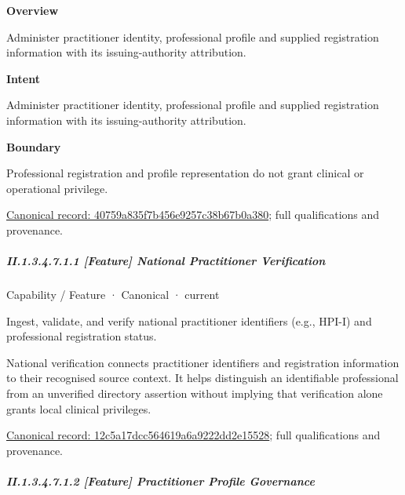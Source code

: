 \textbf{Overview}



Administer practitioner identity, professional profile and supplied registration information with its issuing-authority attribution.



\textbf{Intent}



Administer practitioner identity, professional profile and supplied registration information with its issuing-authority attribution.



\textbf{Boundary}



Professional registration and profile representation do not grant clinical or operational privilege.


{\footnotesize \href{../../../../../../../continuum/strategy/capability/40759a835f7b456e9257c38b67b0a380.md}{Canonical record: 40759a835f7b456e9257c38b67b0a380}; full qualifications and provenance.}\par
\subparagraph*{II.1.3.4.7.1.1 [Feature] National Practitioner Verification}
\label{navigation:II.1.3.4.7.1.1}

\label{element:12c5a17dcc564619a6a9222dd2e15528}
{\small Capability / Feature · Canonical · current}\par

Ingest, validate, and verify national practitioner identifiers (e.g., HPI-I) and professional registration status.



National verification connects practitioner identifiers and registration information to their recognised source context. It helps distinguish an identifiable professional from an unverified directory assertion without implying that verification alone grants local clinical privileges.


{\footnotesize \href{../../../../../../../continuum/strategy/capability/feature/12c5a17dcc564619a6a9222dd2e15528.md}{Canonical record: 12c5a17dcc564619a6a9222dd2e15528}; full qualifications and provenance.}\par
\subparagraph*{II.1.3.4.7.1.2 [Feature] Practitioner Profile Governance}
\label{navigation:II.1.3.4.7.1.2}

